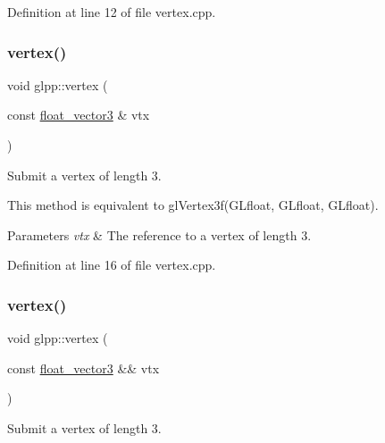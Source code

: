 Definition at line 12 of file vertex.\+cpp.

\mbox{\label{namespaceglpp_a4e4c9b6702745dbcbf1fa0b2e05b6576}} 
\subsubsection{\texorpdfstring{vertex()}{vertex()}\hspace{0.1cm}{\footnotesize\ttfamily [3/8]}}
{\footnotesize\ttfamily void glpp\+::vertex (\begin{DoxyParamCaption}\item[{const \hyperlink{namespaceglpp_a3fa7b207a8b7dba583fb22731a616d73}{float\+\_\+vector3} \&}]{vtx }\end{DoxyParamCaption})\hspace{0.3cm}{\ttfamily [noexcept]}}



Submit a vertex of length 3. 

This method is equivalent to gl\+Vertex3f(\+G\+Lfloat, G\+Lfloat, G\+Lfloat).


\begin{DoxyParams}{Parameters}
{\em vtx} & The reference to a vertex of length 3. \\
\hline
\end{DoxyParams}


Definition at line 16 of file vertex.\+cpp.

\mbox{\label{namespaceglpp_af652cd46d89c12c1c32c0737421defbf}} 
\subsubsection{\texorpdfstring{vertex()}{vertex()}\hspace{0.1cm}{\footnotesize\ttfamily [4/8]}}
{\footnotesize\ttfamily void glpp\+::vertex (\begin{DoxyParamCaption}\item[{const \hyperlink{namespaceglpp_a3fa7b207a8b7dba583fb22731a616d73}{float\+\_\+vector3} \&\&}]{vtx }\end{DoxyParamCaption})\hspace{0.3cm}{\ttfamily [noexcept]}}



Submit a vertex of length 3. 

